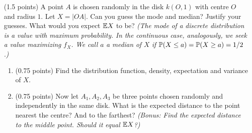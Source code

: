 \documentclass[a4paper]{report}
\begin{document}
\begin{problem}(1.5 points)
A point $A$ is chosen randomly in the disk $k(O,1)$ with centre $O$ and radius $1$. Let
$X=|OA|$. Can you guess
the mode and median? Justify your guesses. What would you expect $\E X$ to be?
\textit{(The mode of a discrete distribution is a value with maximum probability.
In the continuous case, analogously, we seek a value maximizing $f_X$.
We call $a$ a median of $X$ if $\P(X\leq a)=\P(X\geq a)=1/2$.)}

    \begin{enumerate}

    \item (0.75 points) Find the distribution function, density, expectation and
    variance of $X$.


    \item (0.75 points) Now let $A_1,A_2,A_3$ be three points chosen randomly
    and independently in the same disk. What is the expected distance to the point
    nearest the centre? And to the farthest? \textit{(Bonus: Find the expected
distance to the middle point. Should it equal $\E X$?)}


\end{enumerate}
\end{problem}
\end{document}
